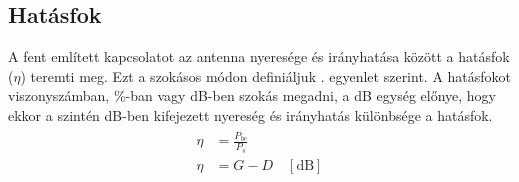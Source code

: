 		\subsection{Hatásfok}
			A fent említett kapcsolatot az antenna nyeresége és irányhatása között a hatásfok ($\eta$) teremti meg. Ezt a szokásos módon definiáljuk . egyenlet szerint. A hatásfokot viszonyszámban, \%-ban vagy dB-ben szokás megadni, a dB egység előnye, hogy ekkor a szintén dB-ben kifejezett nyereség és irányhatás különbsége a hatásfok.
		\begin{align}
			\begin{split}\label{equ:eta}
				\eta & = \frac{P_{be}}{P_s} \\
				\eta & = G - D \quad [\text{dB}]
			\end{split}
		\end{align}
